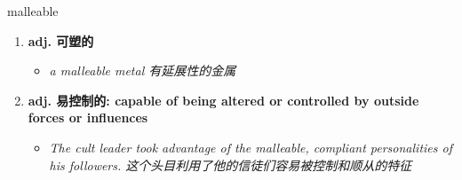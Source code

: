 
\begin{frame}
{\huge malleable}
\begin{center}
\begin{enumerate}\Large
  \item \textbf{adj. 可塑的}
  \begin{itemize}
    \item \em{\Large{a malleable metal 有延展性的金属}}
  \end{itemize}
  \item \textbf{adj. 易控制的: capable of being altered or controlled by outside forces or influences}
  \begin{itemize}
    \item \em{\Large{The cult leader took advantage of the malleable, compliant personalities of his followers. 这个头目利用了他的信徒们容易被控制和顺从的特征}}
  \end{itemize}
\end{enumerate}
\end{center}
\end{frame}
